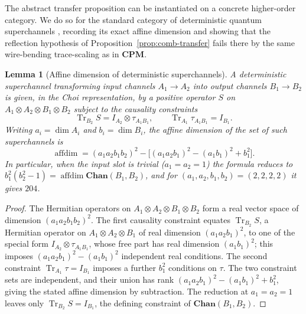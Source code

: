 \documentclass[11pt]{article}
\newtheorem{lemma}[theorem]{Lemma}
\DeclareMathOperator{\affdim}{affdim}
\DeclareMathOperator{\Tr}{Tr}
\begin{document}
The abstract transfer proposition can be instantiated on a concrete
higher-order category. We do so for the standard category of deterministic
quantum superchannels \cite{ChiribellaDArianoPerinotti2008,
ChiribellaDArianoPerinotti2009}, recording its exact affine dimension and
showing that the reflection hypothesis of
Proposition~\ref{prop:comb-transfer} fails there by the same wire-bending
trace-scaling as in $\mathbf{CPM}$.

\begin{lemma}[Affine dimension of deterministic superchannels]
\label{lem:superchannel-dim}
A deterministic superchannel transforming input channels $A_1\to A_2$ into
output channels $B_1\to B_2$ is given, in the Choi representation, by a positive
operator $S$ on $A_1\otimes A_2\otimes B_1\otimes B_2$ subject to the causality
constraints
\[
\Tr_{B_2}S=I_{A_2}\otimes\tau_{A_1B_1},
\qquad
\Tr_{A_1}\tau_{A_1B_1}=I_{B_1}.
\]
Writing $a_i=\dim A_i$ and $b_i=\dim B_i$, the affine dimension of the set of
such superchannels is
\[
\affdim
=
(a_1a_2b_1b_2)^2-\bigl[(a_1a_2b_1)^2-(a_1b_1)^2+b_1^2\bigr].
\]
In particular, when the input slot is trivial ($a_1=a_2=1$) the formula reduces
to $b_1^2(b_2^2-1)=\affdim\mathbf{Chan}(B_1,B_2)$, and for
$(a_1,a_2,b_1,b_2)=(2,2,2,2)$ it gives $204$.
\end{lemma}

\begin{proof}
The Hermitian operators on $A_1\otimes A_2\otimes B_1\otimes B_2$ form a real
vector space of dimension $(a_1a_2b_1b_2)^2$. The first causality constraint
equates $\Tr_{B_2}S$, a Hermitian operator on $A_1\otimes A_2\otimes B_1$ of
real dimension $(a_1a_2b_1)^2$, to one of the special form
$I_{A_2}\otimes\tau_{A_1B_1}$, whose free part has real dimension $(a_1b_1)^2$;
this imposes $(a_1a_2b_1)^2-(a_1b_1)^2$ independent real conditions. The second
constraint $\Tr_{A_1}\tau=I_{B_1}$ imposes a further $b_1^2$ conditions on
$\tau$. The two constraint sets are independent, and their union has rank
$(a_1a_2b_1)^2-(a_1b_1)^2+b_1^2$, giving the stated affine dimension by
subtraction. The reduction at $a_1=a_2=1$ leaves only $\Tr_{B_2}S=I_{B_1}$, the
defining constraint of $\mathbf{Chan}(B_1,B_2)$.
\end{proof}
\end{document}
